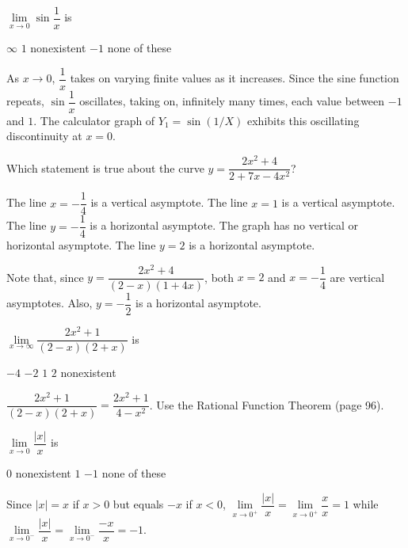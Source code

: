 \question
$\lim\limits_{x \to 0} \sin \dfrac{1}{x}$ is
\begin{choices}
  \choice $\infty$
  \choice $1$
  \CorrectChoice nonexistent
  \choice $-1$
  \choice none of these
\end{choices}
\begin{solution}
As $x \rightarrow 0$, $\dfrac{1}{x}$ takes on varying finite values as it increases. Since the sine function repeats, $\sin \dfrac{1}{x}$ oscillates, taking on, infinitely many times, each value between $-1$ and $1$. The calculator graph of $Y_{1}=\sin (1/X)$ exhibits this oscillating discontinuity at $x=0$.
\end{solution}

\question
Which statement is true about the curve $y=\dfrac{2 x^{2}+4}{2+7 x-4 x^{2}}$?
\begin{choices}
  \CorrectChoice The line $x=-\dfrac{1}{4}$ is a vertical asymptote.
  \choice The line $x=1$ is a vertical asymptote.
  \choice The line $y=-\dfrac{1}{4}$ is a horizontal asymptote.
  \choice The graph has no vertical or horizontal asymptote.
  \choice The line $y=2$ is a horizontal asymptote.
\end{choices}
\begin{solution}
Note that, since $y=\dfrac{2 x^{2}+4}{(2-x)(1+4 x)}$, both $x=2$ and $x=-\dfrac{1}{4}$ are vertical asymptotes. Also, $y=-\dfrac{1}{2}$ is a horizontal asymptote.
\end{solution}

\newpage


\question
$\lim\limits_{x \to \infty} \dfrac{2 x^{2}+1}{(2-x)(2+x)}$ is
\begin{choices}
  \choice $-4$
  \CorrectChoice $-2$
  \choice $1$
  \choice $2$
  \choice nonexistent
\end{choices}
\begin{solution}
$\dfrac{2 x^{2}+1}{(2-x)(2+x)}=\dfrac{2 x^{2}+1}{4-x^{2}}$. Use the Rational Function Theorem (page 96).
\end{solution}

\question
$\lim\limits_{x \to 0} \dfrac{|x|}{x}$ is
\begin{choices}
  \choice $0$
  \CorrectChoice nonexistent
  \choice $1$
  \choice $-1$
  \choice none of these
\end{choices}
\begin{solution}
Since $|x|=x$ if $x>0$ but equals $-x$ if $x<0$, $\lim\limits_{x \to 0^{+}} \dfrac{|x|}{x}=\lim\limits_{x \to 0^{+}} \dfrac{x}{x}=1$ while $\lim\limits_{x \to 0^{-}} \dfrac{|x|}{x}=\lim\limits_{x \to 0^{-}} \dfrac{-x}{x}=-1$.
\end{solution}

